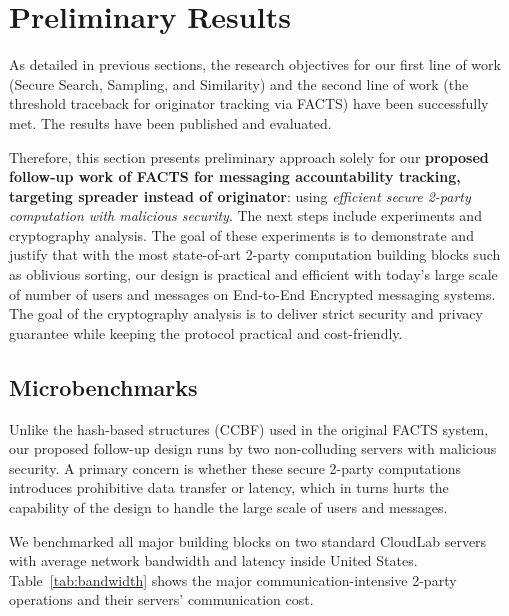 \section{Preliminary Results}

As detailed in previous sections, the research objectives for our first line of work (Secure Search, Sampling, and Similarity) and the second line of work (the threshold traceback for originator tracking via FACTS) have been successfully met. The results have been published and evaluated. 

Therefore, this section presents preliminary approach solely for our \textbf{proposed follow-up work of FACTS for messaging accountability tracking, targeting spreader instead of originator}: using \textit{efficient secure 2-party computation with malicious security}. The next steps include experiments and cryptography analysis. The goal of these experiments is to demonstrate and justify that with the most state-of-art 2-party computation building blocks such as oblivious sorting, our design is practical and efficient with today's large scale of number of users and messages on End-to-End Encrypted messaging systems. The goal of the cryptography analysis is to deliver strict security and privacy guarantee while keeping the protocol practical and cost-friendly. 

\subsection{Microbenchmarks}
Unlike the hash-based structures (CCBF) used in the original FACTS system, our proposed follow-up design runs by two non-colluding servers with malicious security. A primary concern is whether these secure 2-party computations introduces prohibitive data transfer or latency, which in turns hurts the capability of the design to handle the large scale of users and messages. 

We benchmarked all major building blocks on two standard CloudLab servers with average network bandwidth and latency inside United States. Table~\ref{tab:bandwidth} shows the major communication-intensive 2-party operations and their servers' communication cost.

